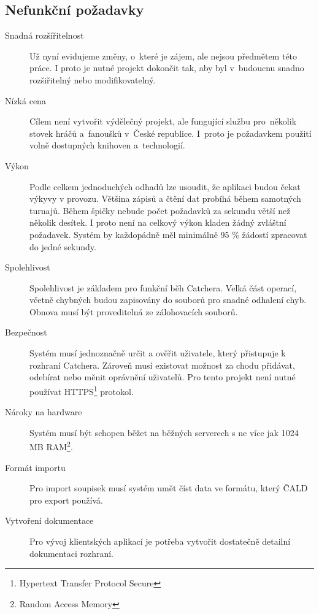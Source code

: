 \subsection{Nefunkční požadavky}

\begin{description}
  \item[Snadná rozšířitelnost]
    Už nyní evidujeme změny, o~které je zájem, ale nejsou předmětem této práce.
    I proto je nutné projekt dokončit tak, aby byl v~budoucnu snadno rozšiřitelný nebo
    modifikovatelný.
  \item[Nízká cena]
    Cílem není vytvořit výdělečný projekt, ale fungující službu pro~několik stovek hráčů
    a~fanoušků v~České republice. I~proto je požadavkem použití volně dostupných
    knihoven a~technologií.
  \item[Výkon]
    Podle celkem jednoduchých odhadů lze usoudit, že aplikaci budou čekat výkyvy v provozu.
    Většina zápisů a čtění dat probíhá během samotných turnajů. Během špičky nebude počet požadavků za sekundu
    větší než několik desítek. I proto není na celkový výkon kladen žádný zvláštní požadavek.
    Systém by každopádně měl minimálně 95 \% žádostí zpracovat do jedné sekundy.
  \item[Spolehlivost]
    Spolehlivost je základem pro funkční běh Catchera. Velká část operací, včetně chybných budou
    zapisovány do souborů pro snadné odhalení chyb. Obnova musí být proveditelná ze zálohovacích souborů.
    \item[Bezpečnost]
    Systém musí jednoznačně určit a ověřit uživatele, který přistupuje k rozhraní Catchera. Zároveň
    musí existovat možnost za chodu přidávat, odebírat nebo měnit oprávnění uživatelů.
    Pro tento projekt není nutné používat HTTPS\footnote{Hypertext Transfer Protocol Secure} protokol.
  \item[Nároky na hardware]
    Systém musí být schopen běžet na běžných serverech s ne více jak 1024 MB RAM\footnote{Random Access Memory}.
  \item[Formát importu]
    Pro import soupisek musí systém umět číst data ve formátu, který ČALD pro export používá.
  \item[Vytvoření dokumentace]
    Pro vývoj klientských aplikací je potřeba vytvořit dostatečně detailní dokumentaci rozhraní.
\end{description}

